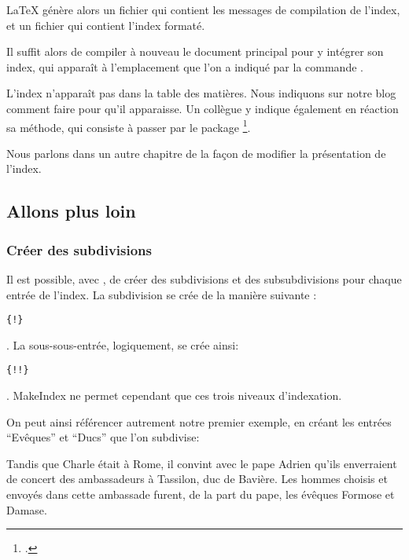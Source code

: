 \LaTeX{} génère alors un fichier  qui contient les messages de compilation de l'index, et un fichier  qui contient l'index formaté.




Il suffit alors de compiler à nouveau le document principal pour y intégrer son index, qui apparaît à l'emplacement que l'on a indiqué par la commande .

\begin{plusloins}
L'index n'apparaît pas dans la table des matières. Nous indiquons sur notre blog comment faire pour qu'il apparaisse. Un collègue y indique également en réaction sa méthode, qui consiste à passer par le package \footcite{indextoc}.

Nous parlons dans un autre chapitre de  la façon de  modifier la présentation de l'index.
\end{plusloins}
\subsection{Allons plus loin}
\subsubsection{Créer des subdivisions}

Il est possible, avec ,  de créer des subdivisions et des subsubdivisions  pour chaque entrée de l'index. La subdivision se crée de la manière suivante : \begin{english}\verb|{|\verb|!|\verb|}|\end{english}. La sous-sous-entrée, logiquement, se crée ainsi: \begin{english}\verb|{|\verb|!|\verb|!|\verb|}|\end{english}. MakeIndex ne permet cependant que ces trois niveaux d'indexation.

On peut ainsi référencer autrement notre premier exemple, en créant les entrées \enquote{Evêques} et \enquote{Ducs} que l'on subdivise:

\begin{latexcode}
Tandis que Charle était à Rome, il convint 
avec le pape Adrien qu’ils enverraient de concert 
des ambassadeurs à Tassilon, duc de Bavière.
\textelp{}
Les hommes choisis et envoyés dans cette ambassade furent, de la 
part du pape, les évêques Formose
et Damase\textelp{}.
\end{latexcode}


